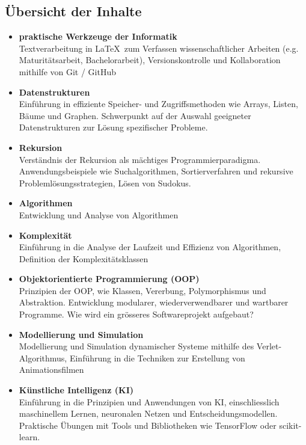 \subsection*{Übersicht der Inhalte}
\begin{itemize}
	\item \textbf{praktische Werkzeuge der Informatik}\\ Textverarbeitung in \LaTeX\ zum Verfassen wissenschaftlicher Arbeiten (e.g. Maturitätsarbeit, Bachelorarbeit), Versionskontrolle und Kollaboration mithilfe von Git / GitHub
	\item \textbf{Datenstrukturen}\\ Einführung in effiziente Speicher- und Zugriffsmethoden wie Arrays, Listen, Bäume und Graphen. Schwerpunkt auf der Auswahl geeigneter Datenstrukturen zur Lösung spezifischer Probleme.
	\item \textbf{Rekursion}\\ Verständnis der Rekursion als mächtiges Programmierparadigma. Anwendungsbeispiele wie Suchalgorithmen, Sortierverfahren und rekursive Problemlösungsstrategien, Lösen von Sudokus.
	\item \textbf{Algorithmen}\\ Entwicklung und Analyse von Algorithmen
	\item \textbf{Komplexität}\\ Einführung in die Analyse der Laufzeit und Effizienz von Algorithmen, Definition der Komplexitätsklassen
	\item \textbf{Objektorientierte Programmierung (OOP)}\\ Prinzipien der OOP, wie Klassen, Vererbung, Polymorphismus und Abstraktion. Entwicklung modularer, wiederverwendbarer und wartbarer Programme. Wie wird ein grösseres Softwareprojekt aufgebaut?
	\item \textbf{Modellierung und Simulation}\\ Modellierung und Simulation dynamischer Systeme mithilfe des Verlet-Algorithmus, Einführung in die Techniken zur Erstellung von Animationsfilmen
	\item \textbf{Künstliche Intelligenz (KI)}\\
	      Einführung in die Prinzipien und Anwendungen von KI, einschliesslich maschinellem Lernen, neuronalen Netzen und Entscheidungsmodellen. Praktische Übungen mit Tools und Bibliotheken wie TensorFlow oder scikit-learn.
\end{itemize}

